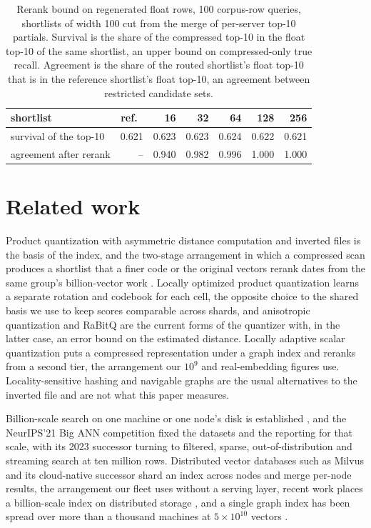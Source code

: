 \documentclass[sigconf, nonacm]{acmart}
\begin{document}
\begin{table}[t]
\caption{Rerank bound on regenerated float rows, 100 corpus-row queries, shortlists of width 100
cut from the merge of per-server top-10 partials. Survival is the share of the compressed top-10 in
the float top-10 of the same shortlist, an upper bound on compressed-only true recall. Agreement is
the share of the routed shortlist's float top-10 that is in the reference shortlist's float top-10,
an agreement between restricted candidate sets.}
\label{tab:rerank}
\centering
\small
\setlength{\tabcolsep}{3.5pt}
\begin{tabular}{lrrrrrr}
\toprule
shortlist & ref.\ & 16 & 32 & 64 & 128 & 256 \\
\midrule
survival of the top-10 & 0.621 & 0.623 & 0.623 & 0.624 & 0.622 & 0.621 \\
agreement after rerank & -- & 0.940 & 0.982 & 0.996 & 1.000 & 1.000 \\
\bottomrule
\end{tabular}
\end{table}

\section{Related work}

Product quantization with asymmetric distance computation and inverted files
\cite{jegou2011product} is the basis of the index, and the two-stage arrangement in which a
compressed scan produces a shortlist that a finer code or the original vectors rerank dates from the
same group's billion-vector work \cite{jegou2011rerank}. Locally optimized product quantization
\cite{kalantidis2014lopq} learns a separate rotation and codebook for each cell, the opposite choice
to the shared basis we use to keep scores comparable across shards, and anisotropic quantization
\cite{guo2020scann} and RaBitQ \cite{gao2024rabitq} are the current forms of the quantizer with, in
the latter case, an error bound on the estimated distance. Locally adaptive scalar quantization
\cite{aguerrebere2023lvq} puts a compressed representation under a graph index and reranks from a
second tier, the arrangement our $10^{9}$ and real-embedding figures use. Locality-sensitive hashing
\cite{indyk1998lsh} and navigable graphs \cite{malkov2020hnsw} are the usual alternatives to the
inverted file and are not what this paper measures.

Billion-scale search on one machine or one node's disk is established
\cite{johnson2019faiss,subramanya2019diskann,chen2021spann}, and the NeurIPS'21 Big ANN competition
\cite{simhadri2022bigann} fixed the datasets and the reporting for that scale, with its 2023
successor \cite{simhadri2024bigann23} turning to filtered, sparse, out-of-distribution and
streaming search at ten million rows. Distributed vector databases such as Milvus
\cite{wang2021milvus} and its cloud-native successor \cite{guo2022manu} shard an index across nodes
and merge per-node results, the arrangement our fleet uses without a serving layer, recent work
places a billion-scale index on distributed storage \cite{yu2025dsann}, and a single graph index
has been spread over more than a thousand machines at $5 \times 10^{10}$ vectors
\cite{adams2025distributedann}.
\end{document}
